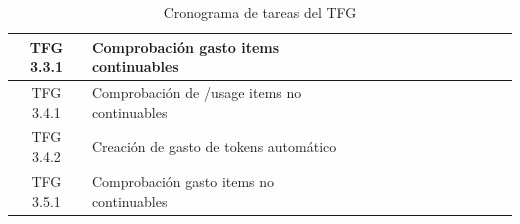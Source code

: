 \begin{table}[h!]
\begin{tabular}{|c|l|c|c|c|c|c|c|c|c|c|c|c|c|}
        \hline
        TFG 3.3.1              & Comprobación gasto items continuables        &                       &                       &                       &                       &                       &                       &                       & \cellcolor{ganttblue} & \cellcolor{ganttblue} &                       &                       & \hspace{0pt}          \\
        \hline
        TFG 3.4.1              & Comprobación de /usage items no continuables &                       &                       &                       &                       &                       &                       &                       &                       &                       & \cellcolor{ganttblue} & \cellcolor{ganttblue} & \hspace{0pt}          \\
        \hline
        TFG 3.4.2              & Creación de gasto de tokens automático       &                       &                       &                       &                       &                       &                       &                       &                       & \cellcolor{ganttblue} & \cellcolor{ganttblue} &                       &                       \\
        \hline
        TFG 3.5.1              & Comprobación gasto items no continuables     &                       &                       &                       &                       &                       &                       &                       &                       &                       &                       &                       & \cellcolor{ganttblue} \\
        \hline
    \end{tabular}
    \caption{Cronograma de tareas del TFG}
\end{table}

